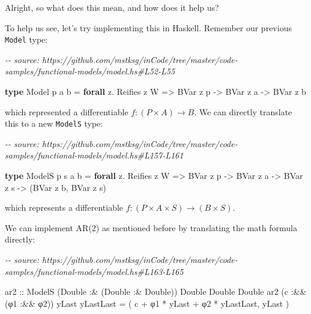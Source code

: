 \documentclass[]{article}
\newenvironment{Shaded}{}{}
\newcommand{\CommentTok}[1]{\textcolor[rgb]{0.38,0.63,0.69}{\textit{#1}}}
\newcommand{\DataTypeTok}[1]{\textcolor[rgb]{0.56,0.13,0.00}{#1}}
\newcommand{\KeywordTok}[1]{\textcolor[rgb]{0.00,0.44,0.13}{\textbf{#1}}}
\newcommand{\NormalTok}[1]{#1}
\newcommand{\OperatorTok}[1]{\textcolor[rgb]{0.40,0.40,0.40}{#1}}
\newcommand{\OtherTok}[1]{\textcolor[rgb]{0.00,0.44,0.13}{#1}}
\begin{document}
Alright, so what does this mean, and how does it help us?

To help us see, let's try implementing this in Haskell. Remember our previous
\texttt{Model} type:

\begin{Shaded}
\begin{Highlighting}[]
\CommentTok{{-}{-} source: https://github.com/mstksg/inCode/tree/master/code{-}samples/functional{-}models/model.hs\#L52{-}L55}

\KeywordTok{type} \DataTypeTok{Model}\NormalTok{ p a b }\OtherTok{=} \KeywordTok{forall}\NormalTok{ z}\OperatorTok{.} \DataTypeTok{Reifies}\NormalTok{ z }\DataTypeTok{W}
                \OtherTok{=>} \DataTypeTok{BVar}\NormalTok{ z p}
                \OtherTok{{-}>} \DataTypeTok{BVar}\NormalTok{ z a}
                \OtherTok{{-}>} \DataTypeTok{BVar}\NormalTok{ z b}
\end{Highlighting}
\end{Shaded}

which represented a differentiable \(f : (P \times A) \rightarrow B\). We can
directly translate this to a new \texttt{ModelS} type:

\begin{Shaded}
\begin{Highlighting}[]
\CommentTok{{-}{-} source: https://github.com/mstksg/inCode/tree/master/code{-}samples/functional{-}models/model.hs\#L157{-}L161}

\KeywordTok{type} \DataTypeTok{ModelS}\NormalTok{ p s a b }\OtherTok{=} \KeywordTok{forall}\NormalTok{ z}\OperatorTok{.} \DataTypeTok{Reifies}\NormalTok{ z }\DataTypeTok{W}
                   \OtherTok{=>} \DataTypeTok{BVar}\NormalTok{ z p}
                   \OtherTok{{-}>} \DataTypeTok{BVar}\NormalTok{ z a}
                   \OtherTok{{-}>} \DataTypeTok{BVar}\NormalTok{ z s}
                   \OtherTok{{-}>}\NormalTok{ (}\DataTypeTok{BVar}\NormalTok{ z b, }\DataTypeTok{BVar}\NormalTok{ z s)}
\end{Highlighting}
\end{Shaded}

which represents a differentiable
\(f : (P \times A \times S) \rightarrow (B \times S)\).

We can implement AR(2) as mentioned before by translating the math formula
directly:

\begin{Shaded}
\begin{Highlighting}[]
\CommentTok{{-}{-} source: https://github.com/mstksg/inCode/tree/master/code{-}samples/functional{-}models/model.hs\#L163{-}L165}

\OtherTok{ar2 ::} \DataTypeTok{ModelS}\NormalTok{ (}\DataTypeTok{Double} \OperatorTok{:\&}\NormalTok{ (}\DataTypeTok{Double} \OperatorTok{:\&} \DataTypeTok{Double}\NormalTok{)) }\DataTypeTok{Double} \DataTypeTok{Double} \DataTypeTok{Double}
\NormalTok{ar2 (c }\OperatorTok{:\&\&}\NormalTok{ (φ1 }\OperatorTok{:\&\&}\NormalTok{ φ2)) yLast yLastLast }\OtherTok{=}
\NormalTok{    ( c }\OperatorTok{+}\NormalTok{ φ1 }\OperatorTok{*}\NormalTok{ yLast }\OperatorTok{+}\NormalTok{ φ2 }\OperatorTok{*}\NormalTok{ yLastLast, yLast )}
\end{Highlighting}
\end{Shaded}
\end{document}
